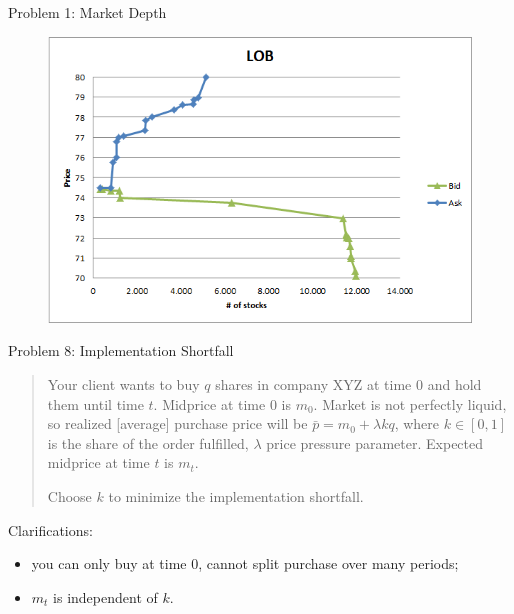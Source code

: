 \documentclass[english,10pt]{beamer}
\theoremstyle{definition}
\begin{document}
\begin{frame}{Problem 1: Market Depth}
\begin{figure}
	\includegraphics[width=.7\paperwidth]{pics/Graph_LOB}
\end{figure}
\end{frame}


\begin{frame}{Problem 8: Implementation Shortfall}
	\begin{quotation}
		Your client wants to buy $q$ shares in company XYZ at time $0$ and hold them until time $t$. Midprice at time $0$ is $m_0$. Market is not perfectly liquid, so realized [average] purchase price will be $\bar{p} = m_0 + \lambda k q$, where $k \in [0,1]$ is the share of the order fulfilled, $\lambda$ price pressure parameter. Expected midprice at time $t$ is $m_t$.
		
		Choose $k$ to minimize the implementation shortfall.
	\end{quotation}

	Clarifications:
	\begin{itemize}
		\item you can only buy at time $0$, cannot split purchase over many periods;
		\item $m_t$ is independent of $k$.
	\end{itemize}
\end{frame}
\end{document}
